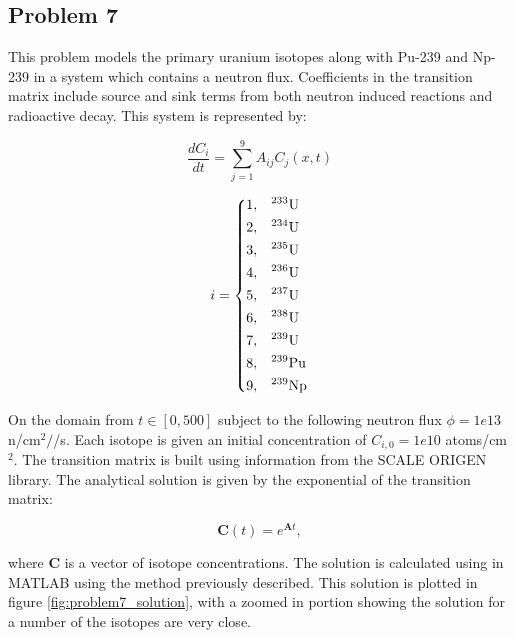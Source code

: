 \clearpage

\subsection{Problem 7}
This problem models the primary uranium isotopes along with Pu-239 and Np-239 in a system which contains a neutron flux. Coefficients in the transition matrix include source and sink terms from both neutron induced reactions and radioactive decay. This system is represented by:


\begin{equation}
\frac{d C_i}{dt} = \sum^9_{j = 1} A_{ij} C_j (x, t)
\end{equation}

\begin{equation}
i = \begin{dcases}
  1 , & \text{$^{233}$U}  \\
  2 , & \text{$^{234}$U}  \\
  3 , & \text{$^{235}$U}  \\
  4 , & \text{$^{236}$U}  \\
  5 , & \text{$^{237}$U}  \\
  6 , & \text{$^{238}$U}  \\
  7 , & \text{$^{239}$U}  \\
  8 , & \text{$^{239}$Pu} \\
  9 , & \text{$^{239}$Np} \\
\end{dcases}
\end{equation}

\noindent On the domain from $t \in [0, 500]$ subject to the following neutron flux $\phi = 1e13$ n/cm$^2/$/s. Each isotope is given an initial concentration of $C_{i, 0} = 1e10$ atoms/cm$^2$. The transition matrix is built using information from the SCALE ORIGEN library. The analytical solution is given by the exponential of the transition matrix:

\begin{equation}
   \boldsymbol{C}(t) = e^{\boldsymbol{A}t}, 
\end{equation}

\noindent where $\boldsymbol{C}$ is a vector of isotope concentrations. The solution is calculated using in MATLAB using the method previously described. This solution is plotted in figure \ref{fig:problem7_solution}, with a zoomed in portion showing the solution for a number of the isotopes are very close. 

\clearpage

